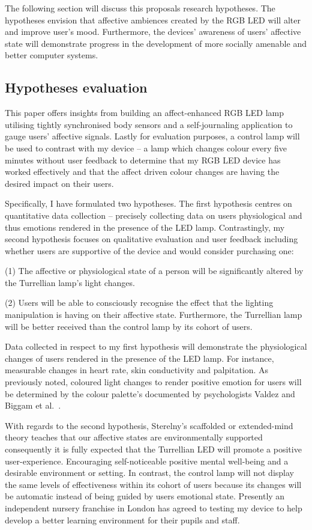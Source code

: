 \documentclass{sigchi}
\begin{document}
The following section will discuss this proposals research hypotheses. The hypotheses envision that affective ambiences created by the RGB LED will alter and improve user’s mood. Furthermore, the devices’ awareness of users’ affective state will demonstrate progress in the development of more socially amenable and better computer systems. 

\subsection{Hypotheses evaluation}

This paper offers insights from building an affect-enhanced RGB LED lamp utilising tightly synchronised body sensors and a self-journaling application to gauge users’ affective signals. Lastly for evaluation purposes, a control lamp will be used to contrast with my device – a lamp which changes colour every five minutes without user feedback to determine that my RGB LED device has worked effectively and that the affect driven colour changes are having the desired impact on their users.

Specifically, I have formulated two hypotheses. The first hypothesis centres on quantitative data collection – precisely collecting data on users physiological and thus emotions rendered in the presence of the LED lamp. Contrastingly, my second hypothesis focuses on qualitative evaluation and user feedback including whether users are supportive of the device and would consider purchasing one:

(1) The affective or physiological state of a person will be significantly altered by the Turrellian lamp’s light changes.

(2) Users will be able to consciously recognise the effect that the lighting manipulation is having on their affective state. Furthermore, the Turrellian lamp will be better received than the control lamp by its cohort of users.

Data collected in respect to my first hypothesis will demonstrate the physiological changes of users rendered in the presence of the LED lamp. For instance, measurable changes in heart rate, skin conductivity and palpitation. As previously noted, coloured light changes to render positive emotion for users will be determined by the colour palette’s documented by psychologists Valdez and Biggam et al.~\cite{biggam2006progress, valdez1994effects}. 

With regards to the second hypothesis, Sterelny’s scaffolded or extended-mind theory teaches that our affective states are environmentally supported~\cite{sterelny2010minds, sterelny2004externalism} consequently it is fully expected that the Turrellian LED will promote a positive user-experience. Encouraging self-noticeable positive mental well-being and a desirable environment or setting. In contrast, the control lamp will not display the same levels of effectiveness within its cohort of users because its changes will be automatic instead of being guided by users emotional state. Presently an independent nursery franchise in London has agreed to testing my device to help develop a better learning environment for their pupils and staff.
\end{document}

